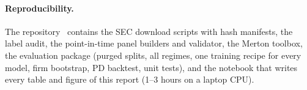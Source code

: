 \paragraph{Reproducibility.} The repository~\cite{repo} contains the SEC download scripts with hash manifests,
the label audit, the point-in-time panel builders and validator, the Merton toolbox, the evaluation package
(purged splits, all regimes, one training recipe for every model, firm bootstrap, PD backtest, unit tests), and the
notebook that writes every table and figure of this report (1--3 hours on a laptop CPU).
